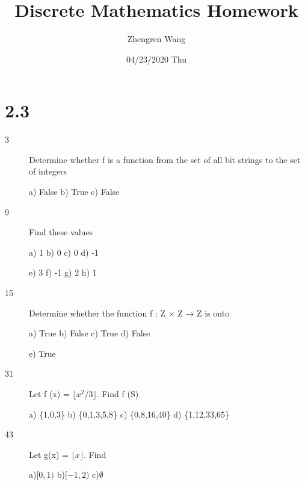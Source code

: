 \documentclass[UTF8]{article}
\title{Discrete Mathematics Homework}
\author{Zhengren Wang \quad 2019081308021}
\date{04/23/2020 Thu }
\begin{document}
\maketitle 

\part{2.3}
\begin{description}
    \item[3]Determine whether f is a function from the set of all bit
strings to the set of integers 

        a) False \quad
        b) True \quad
        c) False \quad
    \item[9]Find these values

        a) 1 \quad
        b) 0 \quad
        c) 0 \quad
        d) -1

        e) 3 \quad
        f) -1 \quad
        g) 2 \quad
        h) 1
    \item[15]Determine whether the function f : Z × Z → Z is onto

        a) True \quad
        b) False \quad
        c) True \quad
        d) False \quad

        e) True\quad
    \item[31]Let f (x) = $\lfloor x^2/3 \rfloor$. Find f (S)

        a) \{1,0,3\} \quad
        b) \{0,1,3,5,8\} \quad
        c) \{0,8,16,40\} \quad
        d) \{1,12,33,65\}
    \item[43]Let g(x) = $\lfloor x \rfloor$. Find
        
        a)$[0,1)$ \quad
        b)$[-1,2)$ \quad
        c)$\emptyset$ \quad


\end{description}
\end{document}
